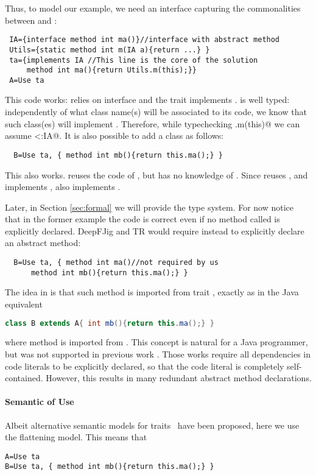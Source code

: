 Thus, to model our example, we need an interface
capturing the commonalities between \Q@A@ and \Q@B@:
\saveSpace
\begin{lstlisting}
 IA={interface method int ma()}//interface with abstract method
 Utils={static method int m(IA a){return ...} }
 ta={implements IA //This line is the core of the solution
     method int ma(){return Utils.m(this);}}
 A=Use ta
\end{lstlisting}
\saveSpace
This code works: \Q@Utils@ relies on interface \Q@IA@ and the trait \Q@ta@
implements \Q@IA@.
\Q@ta@ is well typed: independently of what class name(s) will be
associated to its code, we know that such class(es) will implement
\Q@IA@. 
Therefore, while typechecking \Q@Utils.m(this)@ we can assume
\Q@this<:IA@.
 It is also possible to add a class \Q@B@ as follows:
\saveSpace
\begin{lstlisting}
  B=Use ta, { method int mb(){return this.ma();} }
\end{lstlisting}
\saveSpace
This also works.  \Q@B@ reuses the code of \Q@ta@, but has no knowledge of \Q@A@.
Since \Q@B@ reuses \Q@ta@, and \Q@ta@ implements \Q@IA@, also \Q@B@ implements \Q@IA@. 

Later, in Section \ref{sec:formal} we will provide the type
system. 
For now notice that in the former example the code is correct even if
no method called \Q@ma@ is explicitly declared.
DeepFJig and TR would require instead to explicitly declare an abstract \Q@ma@ method:
\saveSpace
\begin{lstlisting}
  B=Use ta, { method int ma()//not required by us
      method int mb(){return this.ma();} }
\end{lstlisting}\saveSpace
\noindent
The idea in \name is that such method is imported from trait \Q@ta@, exactly as in the Java equivalent
\saveSpace\begin{lstlisting}[language=Java]
  class B extends A{ int mb(){return this.ma();} }  
\end{lstlisting}
\saveSpace
where method \Q@ma@ is imported from \Q@A@.
This concept is natural for a Java programmer, but was not supported
in previous work \cite{BETTINI2013521,deep}. Those works require all
dependencies in code literals to be explicitly declared, so that the
code literal is completely self-contained. However, this results in
many redundant abstract method declarations.

\paragraph{Semantic of Use}
Albeit alternative semantic models for traits~\cite{Traits:ECOOP2003} have been proposed,
here we use the flattening model. This means that 
\saveSpace\begin{lstlisting}
A=Use ta
B=Use ta, { method int mb(){return this.ma();} }
\end{lstlisting}\saveSpace
 
